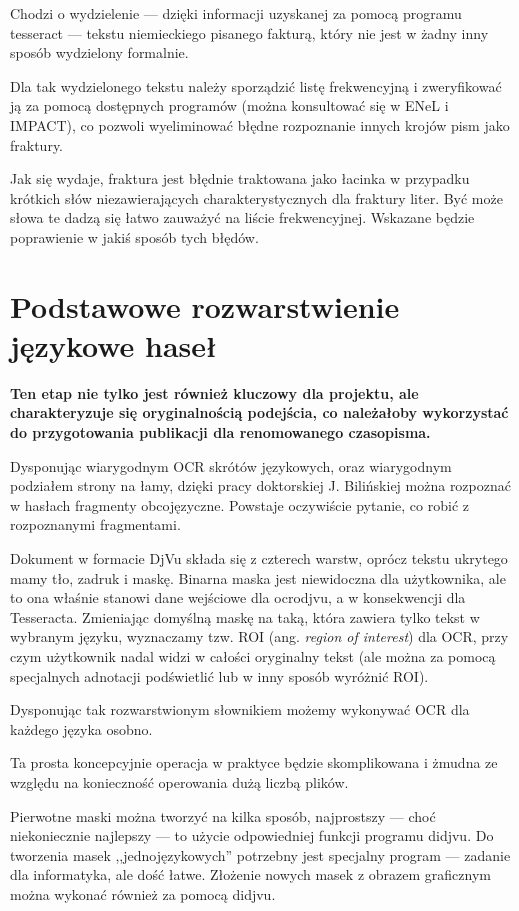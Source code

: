 \documentclass[12]{mwart}
\newcommand{\program}[1]{\textsf{#1}}
\begin{document}
Chodzi o wydzielenie --- dzięki informacji uzyskanej za pomocą
programu \textsf{tesseract} --- tekstu niemieckiego pisanego fakturą,
który nie jest w żadny inny sposób wydzielony formalnie.

Dla tak wydzielonego tekstu należy sporządzić listę frekwencyjną i
zweryfikować ją za pomocą dostępnych programów (można konsultować się
w ENeL i IMPACT), co pozwoli wyeliminować błędne rozpoznanie innych
krojów pism jako fraktury.

Jak się wydaje, fraktura jest błędnie traktowana jako łacinka w
przypadku krótkich słów niezawierających charakterystycznych dla
fraktury liter. Być może słowa te dadzą się łatwo zauważyć na liście
frekwencyjnej. Wskazane będzie poprawienie w jakiś sposób tych błędów.

\section{Podstawowe rozwarstwienie językowe haseł}
\label{sec:rozw-jzyk-hase}

\textbf{Ten etap nie tylko jest również kluczowy dla projektu, ale
charakteryzuje się oryginalnością podejścia, co należałoby wykorzystać
do przygotowania publikacji dla renomowanego czasopisma.
}

Dysponując wiarygodnym OCR  skrótów językowych,
oraz wiarygodnym podziałem strony na łamy, dzięki pracy doktorskiej
J. Bilińskiej można rozpoznać w hasłach fragmenty
obcojęzyczne. Powstaje oczywiście pytanie, co robić z rozpoznanymi
fragmentami.

Dokument w formacie DjVu składa się z czterech warstw, oprócz tekstu
ukrytego mamy tło, zadruk i maskę. Binarna maska jest niewidoczna dla
użytkownika, ale to ona właśnie stanowi dane wejściowe dla
\program{ocrodjvu}, a w konsekwencji dla
\program{Tesseracta}. Zmieniając domyślną maskę na taką, która zawiera
tylko tekst w wybranym języku, wyznaczamy tzw. ROI
(ang. \textit{region of interest}) dla OCR, przy czym użytkownik nadal
widzi w całości oryginalny tekst (ale można za pomocą specjalnych
adnotacji podświetlić lub w inny sposób wyróżnić ROI).

Dysponując tak rozwarstwionym słownikiem możemy wykonywać OCR dla
każdego języka osobno.

Ta prosta koncepcyjnie operacja w praktyce będzie skomplikowana i
żmudna ze względu na konieczność operowania dużą liczbą plików.

Pierwotne maski można tworzyć na kilka sposób, najprostszy --- choć
niekoniecznie najlepszy --- to użycie odpowiedniej funkcji programu
\program{didjvu}. Do tworzenia masek ,,jednojęzykowych'' potrzebny
jest specjalny program --- zadanie dla informatyka, ale dość łatwe.
Złożenie nowych masek z obrazem graficznym można wykonać również za
pomocą \program{didjvu}.
\end{document}
